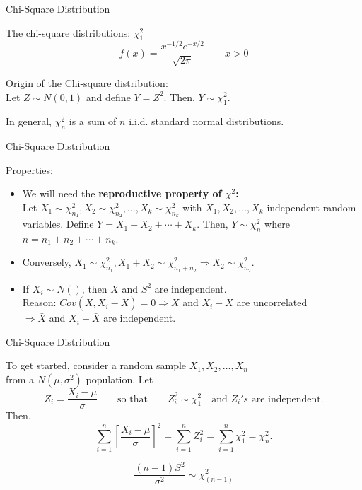 \documentclass{beamer}\usepackage[]{graphicx}\usepackage[]{color}
\begin{document}
\begin{frame}{Chi-Square Distribution}

The chi-square distributions: $\chi_1^2$
$$f(x) = \frac{ x^{-1/2} e^{- x/2}}{\sqrt{2\pi}}
  \qquad x>0$$ \pause
  
Origin of the Chi-square distribution: \\
Let $Z\sim N(0,1)$ and define $Y=Z^2.$  Then, $Y\sim \chi^2_1.$ \pause
\bigskip



\bigskip
In general, $\chi_n^2$ is a sum of $n$ i.i.d. standard normal distributions.

  \end{frame}

\begin{frame}{Chi-Square Distribution}

Properties:
\begin{itemize}
\item
We will need the {\bf reproductive property of $\chi^2$:}\\ \pause
Let $X_1\sim\chi^2_{n_1}, X_2\sim\chi^2_{n_2}, \ldots,
X_k\sim\chi^2_{n_k}$
with $X_1, X_2,\ldots,X_k$ independent random variables.
Define $Y=X_1+X_2+\cdots+X_k.$
Then, $Y\sim\chi^2_n$ where $n=n_1+n_2+\cdots+n_k.$ \pause
\item
Conversely, $X_1\sim\chi^2_{n_1}, X_1 + X_2\sim\chi^2_{n_1 + n_2} \Rightarrow X_2\sim\chi^2_{n_2}$. \pause 
\item
If $X_i \sim N()$, then $\bar{X}$ and $S^2$ are independent. \\ \pause
Reason: $Cov(\bar{X}, X_i - \bar{X}) = 0 \Rightarrow \bar{X}$ and $X_i - \bar{X}$ are uncorrelated\\
$\Rightarrow \bar{X}$ and  $X_i - \bar{X}$ are independent. 

\end{itemize}

\end{frame}

\begin{frame}{Chi-Square Distribution}

To get started, consider a random sample $X_1, X_2,\ldots,X_n$\\
 from a $N(\mu,\sigma^2)$ population. \pause
Let $$Z_i = \frac{X_i-\mu}{\sigma} \qquad\mbox{so that}\qquad
Z_i^2\sim\chi^2_1 \quad\mbox{and\ } Z_i's \mbox{\ are independent.}$$ \pause
Then, 
$$\sum_{i=1}^n \left[\frac{X_i-\mu}{\sigma}\right]^2 
  = \sum_{i=1}^n Z_i^2 = \sum_{i=1}^n \chi^2_1 = \chi^2_n.$$ \pause


$$\frac{(n-1)S^2}{\sigma^2}\sim\chi^2_{(n-1)}$$

\end{frame}
\end{document}
